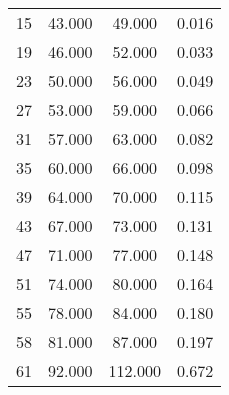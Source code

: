 % 
\begin{tabular}{cccc}
  \hline
  \hline
15 & 43.000 & 49.000 & 0.016 \\ 
  19 & 46.000 & 52.000 & 0.033 \\ 
  23 & 50.000 & 56.000 & 0.049 \\ 
  27 & 53.000 & 59.000 & 0.066 \\ 
  31 & 57.000 & 63.000 & 0.082 \\ 
  35 & 60.000 & 66.000 & 0.098 \\ 
  39 & 64.000 & 70.000 & 0.115 \\ 
  43 & 67.000 & 73.000 & 0.131 \\ 
  47 & 71.000 & 77.000 & 0.148 \\ 
  51 & 74.000 & 80.000 & 0.164 \\ 
  55 & 78.000 & 84.000 & 0.180 \\ 
  58 & 81.000 & 87.000 & 0.197 \\ 
  61 & 92.000 & 112.000 & 0.672 \\ 
   \hline
\end{tabular}
